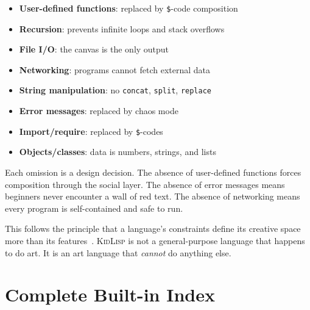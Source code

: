 \documentclass[10pt,letterpaper,twocolumn]{article}
\newcommand{\kl}{\textsc{KidLisp}}
\begin{document}
\begin{itemize}
  \item \textbf{User-defined functions}: replaced by \texttt{\$}-code composition
  \item \textbf{Recursion}: prevents infinite loops and stack overflows
  \item \textbf{File I/O}: the canvas is the only output
  \item \textbf{Networking}: programs cannot fetch external data
  \item \textbf{String manipulation}: no \texttt{concat}, \texttt{split}, \texttt{replace}
  \item \textbf{Error messages}: replaced by chaos mode
  \item \textbf{Import/require}: replaced by \texttt{\$}-codes
  \item \textbf{Objects/classes}: data is numbers, strings, and lists
\end{itemize}

Each omission is a design decision. The absence of user-defined functions forces composition through the social layer. The absence of error messages means beginners never encounter a wall of red text. The absence of networking means every program is self-contained and safe to run.

This follows the principle that a language's constraints define its creative space more than its features~\citep{papert1980mindstorms, compton2015casual}. \kl{} is not a general-purpose language that happens to do art. It is an art language that \emph{cannot} do anything else.

\section{Complete Built-in Index}
\end{document}
